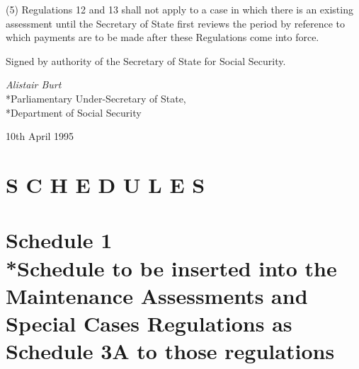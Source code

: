 \documentclass[12pt,a4paper]{article}
\begin{document}
(5) Regulations 12 and 13 shall not apply to a case in which there is an existing assessment until the Secretary of State first reviews the period by reference to which payments are to be made after these Regulations come into force.


\bigskip

Signed by authority of the Secretary of State for Social Security.

{\raggedleft
\emph{Alistair Burt}\\*Parliamentary Under-Secretary of State,\\*Department of Social Security

}

10th April 1995

\clearpage

\part*{S C H E D U L E S}

\part[Schedule 1 --- Schedule to be inserted into the Maintenance Assessments and Special Cases Regulations as Schedule 3A to those regulations]{Schedule 1\\*Schedule to be inserted into the Maintenance Assessments and Special Cases Regulations as Schedule 3A to those regulations}

\renewcommand\parthead{--- Schedule 1}
\end{document}
